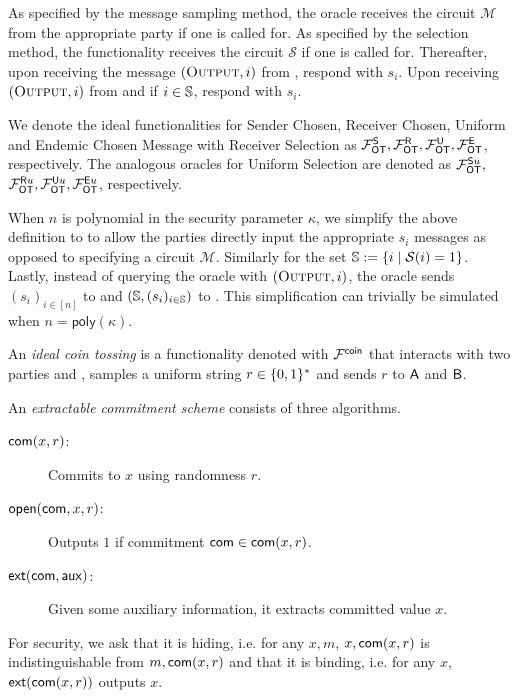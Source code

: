 \begin{definition}
	As specified by the message sampling method, the oracle receives the circuit $\mathcal{M}$ from the appropriate party if one is called for.  As specified by the selection method, the functionality receives the circuit $\mathcal{S}$ if one is called for. 
	Thereafter, upon receiving the message $(\textsc{Output}, i)$ from \send, respond with $s_i$. Upon receiving $(\textsc{Output}, i)$ from \rec and if $i\in \mathsf{\mathbb S}$,  respond with $s_i$. 
	
	We denote the ideal functionalities for Sender Chosen, Receiver Chosen, Uniform and Endemic Chosen Message with Receiver Selection as $\mathcal{F}_{\mathsf{OT}}^\mathsf{S}, \mathcal{F}_{\mathsf{OT}}^\mathsf{R},\mathcal{F}_{\mathsf{OT}}^\mathsf{U},\mathcal{F}_{\mathsf{OT}}^\mathsf{E}$, respectively. The analogous oracles for Uniform Selection are denoted as  $\mathcal{F}_{\mathsf{OT}}^{\mathsf{S} u},$ $\mathcal{F}_{\mathsf{OT}}^{\mathsf{R} u}, \mathcal{F}_{\mathsf{OT}}^{\mathsf{U} u}, \mathcal{F}_{\mathsf{OT}}^{\mathsf{E} u}$, respectively.
\end{definition}
\begin{remark}
	When $n$ is polynomial in the security parameter $\kappa$, we simplify the above definition to  to allow the parties directly input the appropriate $s_i$ messages as opposed to specifying a circuit $\mathcal{M}$. Similarly for the set $\mathsf{\mathbb S}:=\{i \mid \mathcal{S}(i)=1\}$. Lastly, instead of querying the oracle with $(\textsc{Output}, i)$, the oracle sends $(s_i)_{i\in [n]}$ to \send and $(\mathsf{\mathbb S}, (s_i)_{i\in\mathsf{\mathbb S}})$ to \rec. This simplification can trivially be simulated when $n=\textsf{poly}(\kappa)$.
\end{remark}



\begin{definition}\label{def:coin}
An \emph{ideal coin tossing} is a functionality denoted with $\mathcal{F}^{\mathsf{coin}}$ that interacts with two parties \A and \B, samples a uniform string $r\in\{0,1\}^*$ and sends $r$ to $\mathsf{A}$ and $\mathsf{B}$.
\end{definition}

\newcommand{\extract}{\ensuremath{\mathsf{ext}}\xspace}

\begin{definition}\label{def:com}
An \emph{extractable commitment scheme} consists of three algorithms.
\begin{description}
\item[$\mathsf{com}(x,r)$:] Commits to $x$ using randomness $r$. 
\item[$\mathsf{open}(\mathsf{com},x,r)$:] Outputs $1$ if commitment $\mathsf{com}\in\mathsf{com}(x,r)$.
\item[$\extract(\com,\aux)$:] Given some auxiliary information, it extracts committed value $x$. 
\end{description}
For security, we ask that it is hiding, i.e. for any $x,m$, $x, \mathsf{com}(x,r)$ is indistinguishable from $m,\mathsf{com}(x,r)$ and that it is binding, i.e. for any $x$, $\extract(\com(x,r))$ outputs $x$.
\end{definition}

